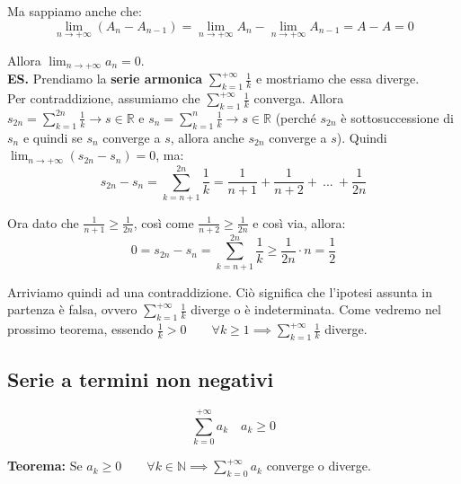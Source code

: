 \documentclass{article}
\begin{document}
\noindent Ma sappiamo anche che:
\begin{equation*}
    \lim_{n \to +\infty} (A_n - A_{n - 1}) = \lim_{n \to +\infty} A_n - \lim_{n \to +\infty} A_{n - 1} = A - A = 0
\end{equation*}

\noindent Allora $\lim_{n \to +\infty} a_n = 0$.\\

\noindent\textbf{ES.} Prendiamo la \textbf{serie armonica} $\sum_{k = 1}^{+\infty} \frac{1}{k}$ e mostriamo che essa diverge.\\
Per contraddizione, assumiamo che $\sum_{k = 1}^{+\infty} \frac{1}{k}$ converga. Allora $s_{2n} = \sum_{k = 1}^{2n} \frac{1}{k} \to s \in \mathbb{R}$ e $s_n = \sum_{k = 1}^n \frac{1}{k} \to s \in \mathbb{R}$ (perché $s_{2n}$ è sottosuccessione di $s_n$ e quindi se $s_n$ converge a $s$, allora anche $s_{2n}$ converge a $s$). Quindi $\lim_{n \to +\infty} (s_{2n} - s_n) = 0$, ma:
\begin{equation*}
    s_{2n} - s_n = \sum_{k = n + 1}^{2n} \frac{1}{k} = \frac{1}{n + 1} + \frac{1}{n + 2} + \ ... \ + \frac{1}{2n}
\end{equation*}

\noindent Ora dato che $\frac{1}{n + 1} \geq \frac{1}{2n}$, così come $\frac{1}{n + 2} \geq \frac{1}{2n}$ e così via, allora:
\begin{equation*}
    0 = s_{2n} - s_n = \sum_{k = n + 1}^{2n} \frac{1}{k} \geq \frac{1}{2n} \cdot n = \frac{1}{2}
\end{equation*}

\noindent Arriviamo quindi ad una contraddizione. Ciò significa che l'ipotesi assunta in partenza è falsa, ovvero $\sum_{k = 1}^{+\infty} \frac{1}{k}$ diverge o è indeterminata. Come vedremo nel prossimo teorema, essendo $\frac{1}{k} > 0 \qquad \forall k \geq 1 \implies \sum_{k = 1}^{+\infty} \frac{1}{k}$ diverge.

\subsection{Serie a termini non negativi}
\begin{equation*}
    \sum_{k = 0}^{+\infty} a_k \quad a_k \geq 0
\end{equation*}

\noindent\textbf{Teorema: } Se $a_k \geq 0 \qquad \forall k \in \mathbb{N} \implies \sum_{k = 0}^{+\infty} a_k$ converge o diverge.\\
\end{document}
